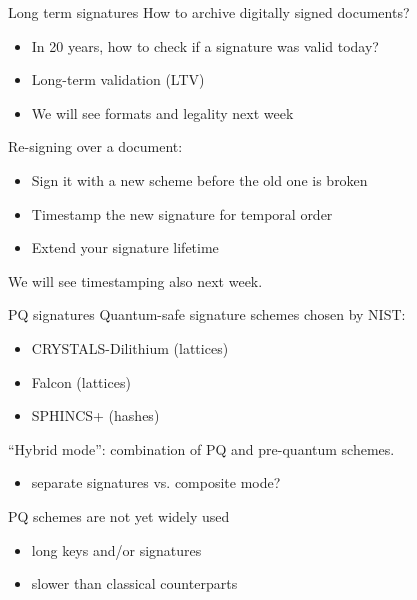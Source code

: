 \begin{frame}{Long term signatures}
  How to archive digitally signed documents?
  \begin{itemize}[<+(1)->]
    \item In 20 years, how to check if a signature was valid today?
    \item Long-term validation (LTV)
    \item We will see formats and legality next week
  \end{itemize}

  \pause
  Re-signing over a document:
  \begin{itemize}[<+(1)->]
    \item Sign it with a new scheme before the old one is broken
    \item Timestamp the new signature for temporal order
    \item Extend your signature lifetime
  \end{itemize}

  \pause
  We will see timestamping also next week.
\end{frame}

\begin{frame}{PQ signatures}
  Quantum-safe signature schemes chosen by NIST:
  \begin{itemize}[<+(1)->]
    \item CRYSTALS-Dilithium (lattices)
    \item Falcon (lattices)
    \item SPHINCS+ (hashes)
  \end{itemize}

  \vspace*{0.5em}

  \pause
  \enquote{Hybrid mode}: combination of PQ and pre-quantum schemes.
  \begin{itemize}[<+(1)->]
    \item separate signatures vs. composite mode?
  \end{itemize}

  \vspace*{0.5em}

  \pause
  PQ schemes are not yet widely used
  \begin{itemize}
    \item long keys and/or signatures
    \item slower than classical counterparts
  \end{itemize}
\end{frame}

